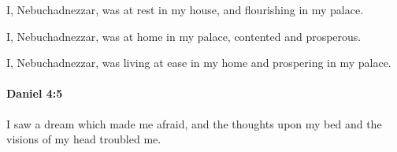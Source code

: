 			\begin{versebox}
					\item[BHS] 
					\item[ASV] I, Nebuchadnezzar, was at rest in my house, and flourishing in my palace.
					\item[NIV] I, Nebuchadnezzar, was at home in my palace, contented and prosperous.
					\item[NRSV] I, Nebuchadnezzar, was living at ease in my home and prospering in my palace.
			\end{versebox}

		\paragraph{Daniel 4:5} %
			\label{DANIEL-4-5}

			I saw a dream which made me afraid, and the thoughts upon my bed and the visions of my head troubled me.

